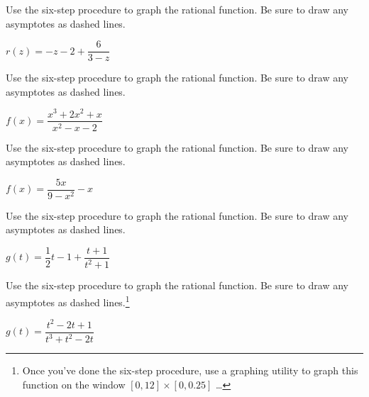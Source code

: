 \documentclass{ximera}
\begin{document}
\begin{problem}
Use the six-step procedure
to graph the rational function.  Be sure to draw any asymptotes as dashed lines.

$r(z) =-z-2+\dfrac{6}{3-z}$
\end{problem} 

\begin{problem}
Use the six-step procedure
to graph the rational function.  Be sure to draw any asymptotes as dashed lines.

$f(x) = \dfrac{x^3+2x^2+x}{x^2-x-2}$
\end{problem}  

\begin{problem}
Use the six-step procedure
to graph the rational function.  Be sure to draw any asymptotes as dashed lines.

$f(x) = \dfrac{5x}{9-x^2} - x$
\end{problem}   

\begin{problem}
Use the six-step procedure
to graph the rational function.  Be sure to draw any asymptotes as dashed lines.

$g(t) =\dfrac{1}{2}t-1 + \dfrac{t+1}{t^2+1}$
\end{problem} 

\begin{problem}\label{sixsteplast}
Use the six-step procedure
to graph the rational function.  Be sure to draw any asymptotes as dashed lines.\footnote{Once you've done the six-step procedure, use a graphing utility to graph this function on the window $[0, 12] \times [0, 0.25]$ \ldots}

$g(t) = \dfrac{t^{2} - 2t + 1}{t^{3} + t^{2} - 2t}$ 
\end{problem} 
\end{document}
